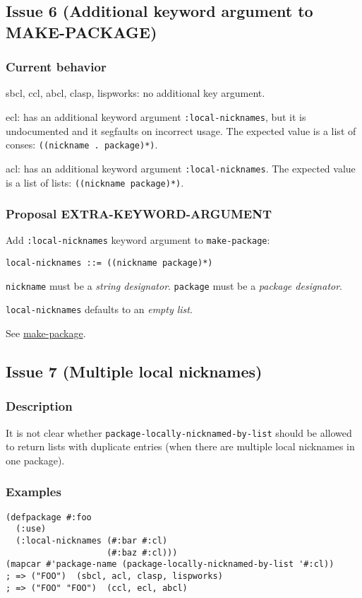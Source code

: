 \documentclass[11pt]{article}
\begin{document}
\subsection{Issue 6 (Additional keyword argument to MAKE-PACKAGE)}
\label{sec:org28d6b88}
\subsubsection{Current behavior}
\label{sec:org99a7e23}
sbcl, ccl, abcl, clasp, lispworks: no additional key argument.

ecl: has an additional keyword argument \texttt{:local-nicknames}, but it is undocumented
and it segfaults on incorrect usage. The expected value is a list of conses:
\texttt{((nickname . package)*)}.

acl: has an additional keyword argument \texttt{:local-nicknames}. The expected value is
a list of lists: \texttt{((nickname package)*)}.
\subsubsection{Proposal EXTRA-KEYWORD-ARGUMENT}
\label{sec:org5473b89}
Add \texttt{:local-nicknames} keyword argument to \texttt{make-package}:
\begin{verbatim}
local-nicknames ::= ((nickname package)*)
\end{verbatim}

\texttt{nickname} must be a \emph{string designator}.
\texttt{package} must be a \emph{package designator}.

\texttt{local-nicknames} defaults to an \emph{empty list}.

See \hyperref[sec:orgd9ef999]{make-package}.

\subsection{Issue 7 (Multiple local nicknames)}
\label{sec:orge0c95b8}
\subsubsection{Description}
\label{sec:orgb684821}
It is not clear whether \texttt{package-locally-nicknamed-by-list} should be allowed to return
lists with duplicate entries (when there are multiple local nicknames in one package).
\subsubsection{Examples}
\label{sec:org117d806}
\begin{verbatim}
(defpackage #:foo
  (:use)
  (:local-nicknames (#:bar #:cl)
                    (#:baz #:cl)))
(mapcar #'package-name (package-locally-nicknamed-by-list '#:cl))
; => ("FOO")  (sbcl, acl, clasp, lispworks)
; => ("FOO" "FOO")  (ccl, ecl, abcl)
\end{verbatim}
\end{document}
